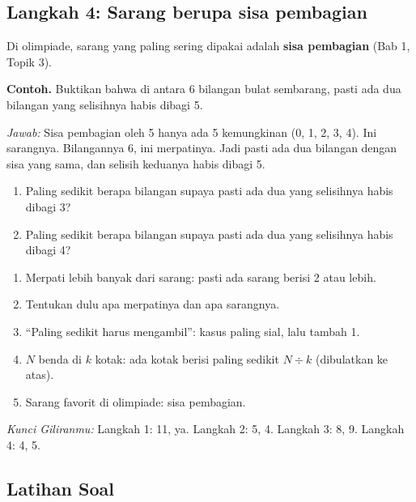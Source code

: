\documentclass[11pt,a4paper]{article}
\begin{document}
\subsection*{Langkah 4: Sarang berupa sisa pembagian}
Di olimpiade, sarang yang paling sering dipakai adalah \textbf{sisa pembagian} (Bab 1, Topik 3).

\begin{contoh}
\textbf{Contoh.} Buktikan bahwa di antara 6 bilangan bulat sembarang, pasti ada dua bilangan
yang selisihnya habis dibagi 5.

\textit{Jawab:} Sisa pembagian oleh 5 hanya ada 5 kemungkinan (0, 1, 2, 3, 4). Ini sarangnya.
Bilangannya 6, ini merpatinya. Jadi pasti ada dua bilangan dengan sisa yang sama, dan selisih
keduanya habis dibagi 5.
\end{contoh}

\begin{giliranmu}
\begin{enumerate}[label=\alph*.]
    \item Paling sedikit berapa bilangan supaya pasti ada dua yang selisihnya habis dibagi 3? \kosong
    \item Paling sedikit berapa bilangan supaya pasti ada dua yang selisihnya habis dibagi 4? \kosong
\end{enumerate}
\end{giliranmu}

\begin{rangkuman}
\begin{enumerate}
    \item Merpati lebih banyak dari sarang: pasti ada sarang berisi 2 atau lebih.
    \item Tentukan dulu apa merpatinya dan apa sarangnya.
    \item ``Paling sedikit harus mengambil'': kasus paling sial, lalu tambah 1.
    \item $N$ benda di $k$ kotak: ada kotak berisi paling sedikit $N \div k$ (dibulatkan ke atas).
    \item Sarang favorit di olimpiade: sisa pembagian.
\end{enumerate}
\end{rangkuman}

\textit{Kunci Giliranmu:} Langkah 1: 11, ya. \quad Langkah 2: 5, 4. \quad Langkah 3: 8, 9.
\quad Langkah 4: 4, 5.

\newpage
\subsection*{Latihan Soal}
\end{document}
